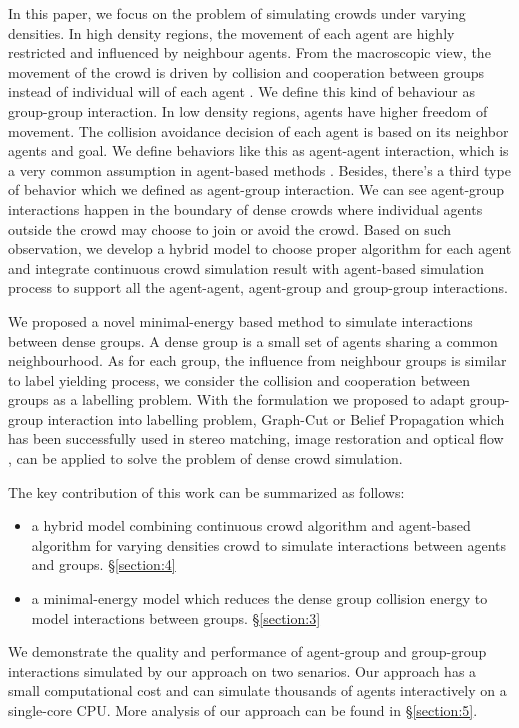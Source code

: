 \documentclass{egpubl}
\begin{document}
In this paper, we focus on the problem of simulating crowds under varying densities. In high density regions, the movement of each agent are highly restricted and influenced by neighbour agents. From the macroscopic view, the movement of the crowd is driven by collision and cooperation between groups instead of individual will of each agent \cite{Narain:2009}. We define this kind of behaviour as group-group interaction. In low density regions, agents have higher freedom of movement. The collision avoidance decision of each agent is based on its neighbor agents and goal. We define behaviors like this as agent-agent interaction, which is a very common assumption in agent-based methods \cite{Guy:2009,VDBerg:2011,Ondrej:2010}. Besides, there's a third type of behavior which we defined as agent-group interaction. We can see agent-group interactions happen in the boundary of dense crowds where individual agents outside the crowd may choose to join or avoid the crowd. Based on such observation, we develop a hybrid model to choose proper algorithm for each agent and integrate continuous crowd simulation result with agent-based simulation process to support all the agent-agent, agent-group and group-group interactions. 

We proposed a novel minimal-energy based method to simulate interactions between dense groups. A dense group is a small set of agents sharing a common neighbourhood. As for each group, the influence from neighbour groups is similar to label yielding process, we consider the collision and cooperation between groups as a labelling problem. With the formulation we proposed to adapt group-group interaction into labelling problem, Graph-Cut or Belief Propagation which has been successfully used in stereo matching, image restoration and optical flow \cite{Pedro:2004,Marshall:2003,Qingxiong:2009}, can be applied to solve the problem of dense crowd simulation. 

The key contribution of this work can be summarized as follows:
\begin{itemize}
\item a hybrid model combining continuous crowd algorithm and agent-based algorithm for varying densities crowd to simulate interactions between agents and groups. \S\ref{section:4}
\item a minimal-energy model which reduces the dense group collision energy to model interactions between groups. \S\ref{section:3}
\end{itemize}

We demonstrate the quality and performance of agent-group and group-group interactions simulated by our approach on two senarios. Our approach has a small computational cost and can simulate thousands of agents interactively on a single-core CPU. More analysis of our approach can be found in \S\ref{section:5}. 
\end{document}
